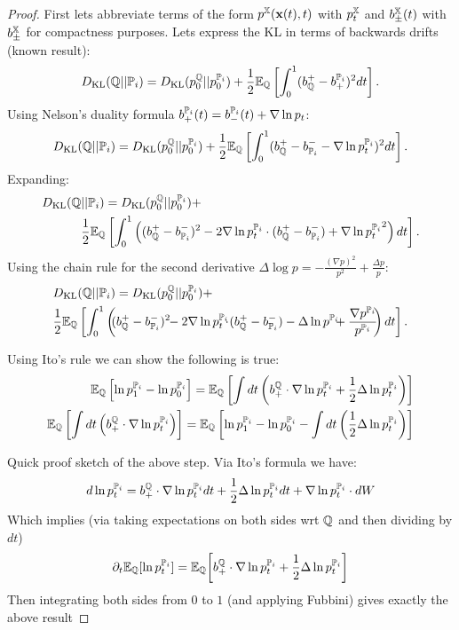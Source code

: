 \documentclass[a4paper,12pt,twoside,openright]{report}
\theoremstyle{definition}
\begin{document}
\begin{proof}
First lets  abbreviate  terms of the form $p^{\X}(\rvx(t), t)$ with $p^{\X}_t$ and $b^{\X}_{\pm}(t)$ with $b^{\X}_{\pm}$ for compactness purposes. Lets express the KL in terms of backwards drifts (known result):
\begin{align}
\KL(\Q||{\P_{i}}) = \KL( p_0^{\Q}|| p_0^{{\P_{i}}}) + \frac{1}{2}\E_{\Q}\left[\int_0^1 ( b_\Q^{+} - b^{\P_{i}}_{+})^2 dt\right].
\end{align}
Using Nelson's duality formula $b^{\P_{i}}_+(t) =b^{\P_{i}}_-(t) + \nabla\log p_t$:
\begin{align}
\KL(\Q||{\P_{i}}) = \KL( p_0^{\Q}|| p_0^{{\P_{i}}}) + \frac{1}{2}\E_{\Q}\left[\int_0^1 ( b_\Q^{+} - b_{\P_{i}}^{-} - \nabla\log p_t^{\P_{i}})^2 dt\right].
\end{align}
Expanding:
\begin{align*}
\KL(\Q&||{\P_{i}}) = \KL( p_0^{\Q}|| p_0^{{\P_{i}}}) +\\ &\frac{1}{2}\E_{\Q}\left[\int_0^1 \left(( b_\Q^{+} - b_{\P_{i}}^{-})^2 - 2\nabla\log p_t^{\P_{i}} \cdot ( b_\Q^{+} - b_{\P_{i}}^{-}) + {\nabla\log p_t^{\P_{i}}}^2 \right)dt\right].
\end{align*}
Using the chain rule for the second derivative $\Delta \log  p = -\frac{(\nabla p)^2}{ p^2}  + \frac{\Delta  p}{ p}$:
\begin{align*}
&\KL(\Q||{\P_{i}}) =\KL( p_0^{\Q}|| p_0^{{\P_{i}}}) +\\ &\frac{1}{2}\E_{\Q}\left[\int_0^1 \left(\!\!( b_\Q^{+} - b_{\P_{i}}^{-})^2 \!\!- 2\nabla\log p_t^{\P_{i}}\!\!\!\cdot \!( b_\Q^{+} - b_{\P_{i}}^{-}) - \Delta \log  p^{\P_{i}}\!\!\!+ \frac{\nabla  p^{\P_{i}}}{ p^{\P_{i}}}\!\!\right)dt\right].
\end{align*}

Using Ito's rule we can show the following is true: 
\begin{align*}
\E_\Q\left[\log p^{\P_{i}}_1-\log p^{\P_{i}}_0\right] = \E_\Q\left[\int dt \left(b_+^\Q\cdot\nabla\log p_t^{\P_{i}} + \frac{1}{2}\Delta \log p_t^{\P_{i}}\right)\right]\\
\E_\Q\left[\int dt \left(b_+^\Q\cdot\nabla\log p_t^{\P_{i}} \right)\right] = \E_\Q\left[\log p^{\P_{i}}_1-\log p^{\P_{i}}_0 - \int dt \left( \frac{1}{2}\Delta \log p_t^{\P_{i}}\right)\right]
\end{align*}

Quick proof sketch of the above step. Via Ito's formula we have:
\begin{align*}
d\log  p_t^{{\P_{i}}} = b_+^\Q\cdot\nabla\log p_t^{\P_{i}} dt + \frac{1}{2}\Delta \log p_t^{\P_{i}} dt + \nabla \log p_t^{\P_{i}} \cdot dW
\end{align*}
Which implies (via taking expectations on both sides wrt $\Q$ and then dividing by $dt$)
\begin{align*}
\partial_t \E_{\Q}[\log  p_t^{{\P_{i}}}] = \E_{\Q}{\left[b_+^\Q\cdot\nabla\log p_t^{\P_{i}} + \frac{1}{2}\Delta \log p_t^{\P_{i}}\right]}
\end{align*}
Then integrating both sides from $0$ to $1$ (and applying Fubbini) gives exactly the above result


\end{proof}
\end{document}

